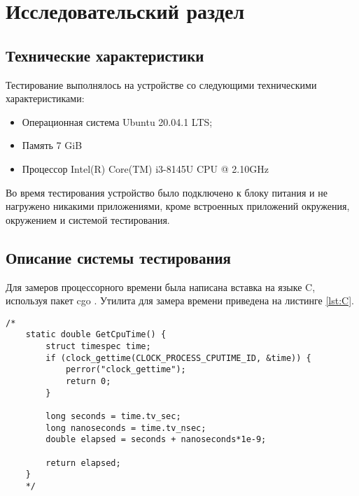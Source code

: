 \chapter{Исследовательский раздел}

\section{Технические характеристики}

Тестирование выполнялось на устройстве со следующими техническими характеристиками:
\begin{itemize}
	\item Операционная система Ubuntu 20.04.1 LTS;
	\item Память 7 GiB
	\item Процессор Intel(R) Core(TM) i3-8145U CPU @ 2.10GHz \cite{intel}
\end{itemize}
Во время тестирования устройство было подключено к блоку питания и не нагружено никакими приложениями, кроме встроенных приложений окружения, окружением и системой тестирования.

\section{Описание системы тестирования}

Для замеров процессорного времени была написана вставка на языке C, используя пакет cgo \cite{cgo}. Утилита для замера времени приведена на листинге \ref{lst:C}.

\captionsetup{singlelinecheck = false, justification=raggedright}
\begin{lstlisting}[label=lst:C,caption=Вставка на языке С для замера времени]
	/*
	static double GetCpuTime() {
		struct timespec time;
		if (clock_gettime(CLOCK_PROCESS_CPUTIME_ID, &time)) {
			perror("clock_gettime");
			return 0;
		}
		
		long seconds = time.tv_sec;
		long nanoseconds = time.tv_nsec;
		double elapsed = seconds + nanoseconds*1e-9;
		
		return elapsed;
	}
	*/
\end{lstlisting}

